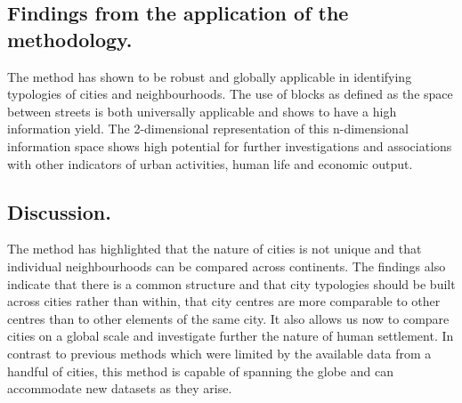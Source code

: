 \documentclass{nature}
\begin{document}
\subsection{Findings from the application of the methodology.}
The method has shown to be robust and globally applicable in identifying typologies of cities and neighbourhoods. The use of blocks as defined as the space between streets is both universally applicable and shows to have a high information yield. The 2-dimensional representation of this n-dimensional information space shows high potential for further investigations and associations with other indicators of urban activities, human life and economic output.

\subsection{Discussion.}
The method has highlighted that the nature of cities is not unique and that individual neighbourhoods can be compared across continents. The findings also indicate that there is a common structure and that city typologies should be built across cities rather than within, that city centres are more comparable to other centres than to other elements of the same city.
It also allows us now to compare cities on a global scale and investigate further the nature of human settlement. In contrast to previous methods which were limited by the available data from a handful of cities, this method is capable of spanning the globe and can accommodate new datasets as they arise.  
\end{document}
